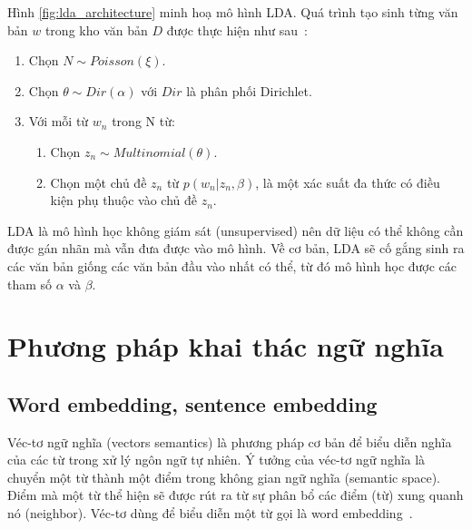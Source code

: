 

Hình \ref{fig:lda_architecture} minh hoạ mô hình LDA. Quá trình tạo sinh từng
văn bản $w$ trong kho văn bản $D$ được thực hiện như
sau~\cite{bleiLatentDirichletAllocation2003}:

\begin{enumerate}
	\item Chọn $N \sim Poisson(\xi)$.
	\item Chọn $\theta \sim Dir(\alpha)$ với $Dir$ là phân phối Dirichlet.
	\item Với mỗi từ $w_n$ trong N từ:
	\begin{enumerate}
		\item Chọn $z_n \sim Multinomial(\theta)$.
		\item Chọn một chủ đề $z_n$ từ $p(w_n|z_n,\beta)$, là một xác suất đa
		thức có điều kiện phụ thuộc vào chủ đề $z_n$.
	\end{enumerate}
\end{enumerate}

LDA là mô hình học không giám sát (unsupervised) nên dữ liệu có thể không cần
được gán nhãn mà vẫn đưa được vào mô hình. Về cơ bản, LDA sẽ cố gắng sinh ra
các văn bản giống các văn bản đầu vào nhất có thể, từ đó mô hình học được các
tham số $\alpha$ và $\beta$.


\section{Phương pháp khai thác ngữ nghĩa}
\subsection{Word embedding, sentence embedding}
Véc-tơ ngữ nghĩa (vectors semantics) là phương pháp cơ bản để biểu diễn nghĩa
của các từ trong xử lý ngôn ngữ tự nhiên. Ý tưởng của véc-tơ ngữ nghĩa là
chuyển một từ thành một điểm trong không gian ngữ nghĩa (semantic space). Điểm
mà một từ thể hiện sẽ được rút ra từ sự phân bổ các điểm (từ) xung quanh nó
(neighbor). Véc-tơ dùng để biểu diễn một từ gọi là word
embedding~\cite{jurafskySpeechLanguageProcessing}.

